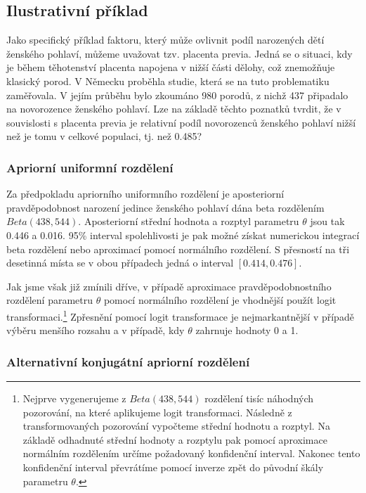 \subsection{Ilustrativní příklad}

Jako specifický příklad faktoru, který může ovlivnit podíl narozených dětí ženského pohlaví, můžeme uvažovat tzv. placenta previa. Jedná se o situaci, kdy je během těhotenství placenta napojena v nižší části dělohy, což znemožňuje klasický porod. V Německu proběhla studie, která se na tuto problematiku zaměřovala. V jejím průběhu bylo zkoumáno 980 porodů, z nichž 437 připadalo na novorozence ženského pohlaví. Lze na základě těchto poznatků tvrdit, že v souvislosti s placenta previa je relativní podíl novorozenců ženského pohlaví nižší než je tomu v celkové populaci, tj. než 0.485?

\subsubsection{Apriorní uniformní rozdělení}

Za předpokladu apriorního uniformního rozdělení je aposteriorní pravděpodobnost narození jedince ženského pohlaví dána beta rozdělením $\textit{Beta}(438, 544)$. Aposteriorní střední hodnota a rozptyl parametru $\theta$ jsou tak 0.446 a 0.016. 95\% interval spolehlivosti je pak možné získat numerickou integrací beta rozdělení nebo aproximací pomocí normálního rozdělení. S přesností na tři desetinná místa se v obou případech jedná o interval $[0.414, 0.476]$.

Jak jsme však již zmínili dříve, v případě aproximace pravděpodobnostního rozdělení parametru $\theta$ pomocí normálního rozdělení je vhodnější použít logit transformaci.\footnote{Nejprve vygenerujeme z $\textit{Beta}(438,544)$ rozdělení tisíc náhodných pozorování, na které aplikujeme logit transformaci. Následně z transformovaných pozorování vypočteme střední hodnotu a rozptyl. Na základě odhadnuté střední hodnoty a rozptylu pak pomocí aproximace normálním rozdělením určíme požadovaný konfidenční interval. Nakonec tento konfidenční interval převrátíme pomocí inverze zpět do původní škály parametru $\theta$.} Zpřesnění pomocí logit transformace je nejmarkantnější v případě výběru menšího rozsahu a v případě, kdy $\theta$ zahrnuje hodnoty 0 a 1.

\subsubsection{Alternativní konjugátní apriorní rozdělení}

